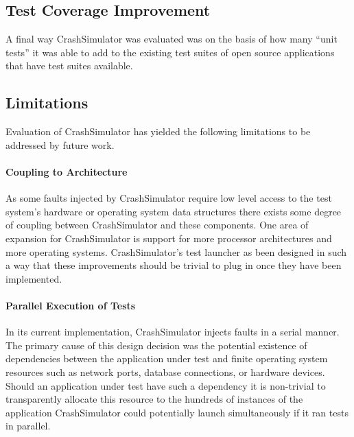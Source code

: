 

    \subsection{Test Coverage Improvement}

        A final way CrashSimulator was evaluated was on the basis of how many ``unit tests'' it was able to add to the
        existing test suites of open source applications that have test suites available.

    \subsection{Limitations}

        Evaluation of CrashSimulator has yielded the following limitations to be addressed by future work.

        \paragraph{Coupling to Architecture}

            As some faults injected by CrashSimulator require low level access to the test system's hardware or
            operating system data structures there exists some degree of coupling between CrashSimulator and these
            components. One area of expansion for CrashSimulator is support for more processor architectures and more
            operating systems.  CrashSimulator's test launcher as been designed in such a way that these improvements
            should be trivial to plug in once they have been implemented.

        \paragraph{Parallel Execution of Tests}

            In its current implementation, CrashSimulator injects faults in a serial manner. The primary cause of this
            design decision was the potential existence of dependencies between the application under test and finite
            operating system resources such as network ports, database connections, or hardware devices. Should an
            application under test have such a dependency it is non-trivial to transparently allocate this resource to
            the hundreds of instances of the application CrashSimulator could potentially launch simultaneously if it
            ran tests in parallel.


